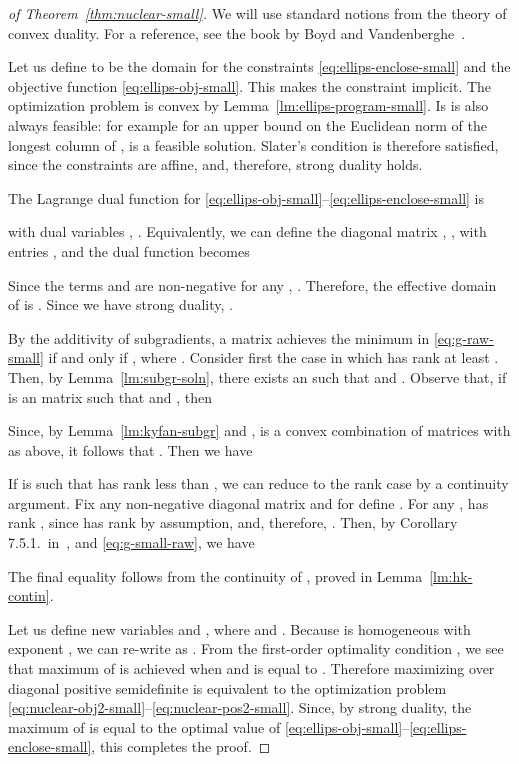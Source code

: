 \documentclass{article}
\begin{document}
\begin{proof}[of Theorem~\ref{thm:nuclear-small}]
  We will use standard notions from the theory of convex duality. For
  a reference, see the book by Boyd and Vandenberghe~\cite{BoydV-cvx}.

  Let us define  to be the domain for the
  constraints \eqref{eq:ellips-enclose-small} and the objective
  function \eqref{eq:ellips-obj-small}. This makes the constraint  implicit.  The optimization problem is convex by
  Lemma~\ref{lm:ellips-program-small}. Is is also always feasible: for
  example for  an upper bound on the Euclidean norm of the longest
  column of ,  is a feasible
  solution. Slater's condition is therefore satisfied, since the
  constraints are affine, and, therefore, strong duality holds.

  The Lagrange dual function for
  \eqref{eq:ellips-obj-small}--\eqref{eq:ellips-enclose-small} is
  
  with dual variables , . Equivalently, we
  can define the diagonal matrix , , with entries , and the dual function becomes
  
  Since the terms  and  are
  non-negative for any , . Therefore, the effective domain  of
   is . Since we have
  strong duality, .
  
  By the additivity of subgradients, a matrix   achieves the minimum
  in \eqref{eq:g-raw-small} if and only if ,
  where .  Consider first the case in which
   has rank at least . Then, by Lemma~\ref{lm:subgr-soln},
  there exists an  such that  and
  . Observe that, if  is an  matrix such
  that  and ,
  then 
  
  Since, by Lemma~\ref{lm:kyfan-subgr} and ,  is a convex combination of matrices  with  as above, it follows that . Then we have
  

  If  is such that  has rank less than , we can reduce
  to the rank  case by a continuity argument. Fix any non-negative
  diagonal matrix  and for  define . For any ,
   has rank , since  has rank
   by assumption, and, therefore, . Then, by Corollary
  7.5.1.~in~\cite{Rockafellar}, and \eqref{eq:g-small-raw}, we have
   
  The final equality follows from the continuity of , proved in
  Lemma~\ref{lm:hk-contin}. 
  
  Let us define new variables  and , where  and . Because  is homogeneous with exponent , we can
  re-write  as .
  From the first-order optimality condition , we see that maximum of  is achieved
  when  and is equal to
  . Therefore maximizing  over diagonal
  positive semidefinite  is equivalent to the optimization problem
  \eqref{eq:nuclear-obj2-small}--\eqref{eq:nuclear-pos2-small}. Since,
  by strong duality, the maximum of  is equal to the optimal
  value of
  \eqref{eq:ellips-obj-small}--\eqref{eq:ellips-enclose-small}, this
  completes the proof. 
\end{proof}
\end{document}
